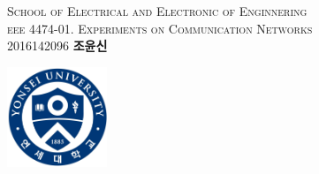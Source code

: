 \documentclass[a4paper]{article}
\begin{document}
\pagestyle{fancy}
\fancyhf{}
\cfoot{\thepage}
\renewcommand\headrulewidth{0.3mm}
\renewcommand\footrulewidth{0.0mm}
\thispagestyle{plain}

\begin{flushleft}
\textsc{School of Electrical and Electronic of Enginnering} \\

\textsc{eee 4474-01. Experiments on Communication Networks}\\[0.1cm]
\small{\textsc{{2016142096 \textbf{조윤신}}}}\\
\end{flushleft}

\begin{flushright}\vspace{-25mm}
\includegraphics[height=3cm]{image/1.jpg}
\vspace{5mm}
\end{flushright}
 
\end{document}
